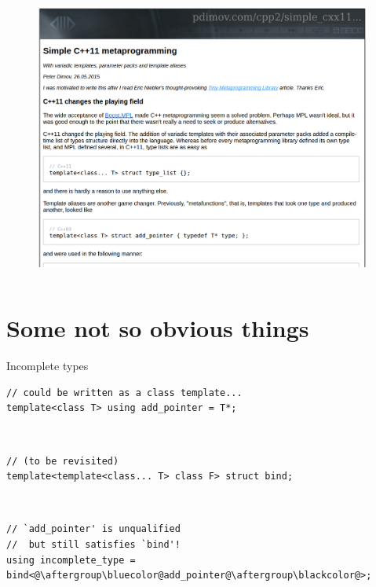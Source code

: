 \documentclass[xcolor=dvipsnames]{beamer}
\begin{document}
\begin{frame}[plain]
  \begin{columns}[T] %
    \begin{column}{0.9\textwidth}
      \begin{figure}[H]
        \centering
        \includegraphics[width=0.99\textwidth]{pdimov}
      \end{figure}
    \end{column}%
  \end{columns}
\end{frame}


\section{Some not so obvious things}

\begin{frame}[fragile]{Incomplete types}
\begin{lstlisting}
// could be written as a class template...
template<class T> using add_pointer = T*;
\end{lstlisting}

~

\begin{lstlisting}
// (to be revisited)
template<template<class... T> class F> struct bind;
\end{lstlisting}

~

\begin{lstlisting}
// `add_pointer' is unqualified
//  but still satisfies `bind'!
using incomplete_type = bind<@\aftergroup\bluecolor@add_pointer@\aftergroup\blackcolor@>;
\end{lstlisting}
\end{frame}
\end{document}
